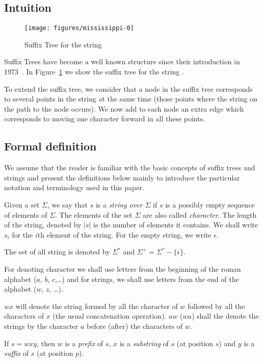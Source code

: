 \subsection{Intuition}

\begin{figure}
\texttt{[image: figures/mississippi-0]}
\caption{Suffix Tree for the string }%
\label{fig:mississippi-0}
\end{figure}

Suffix Trees have become a well known structure since their introduction in 1973~\cite{weiner}. In Figure~\ref{fig:mississippi-0} we show the suffix tree for the string .

To extend the suffix tree, we consider that a node in the suffix tree corresponds to several points in the string at the same time (those points where the string on the path to the node occurs). We now add to each node an extra edge which corresponds to moving one character forward in all these points.

\subsection{Formal definition}

We assume that the reader is familiar with the basic concepts of suffix trees and strings and present the definitions below mainly to introduce the particular notation and terminology used in this paper.

\begin{definition}
Given a set $\Sigma$, we say that $s$ is a \emph{string over $\Sigma$} if $s$ is a possibly empty sequence of elements of $\Sigma$. The elements of the set $\Sigma$ are also called \emph{character}. The length of the string, denoted by $|s|$ is the number of elements it contains. We shall write $s_i$ for the $i$th element of the string. For the empty string, we write $\epsilon$.

The set of all string is denoted by $\Sigma^*$ and $\Sigma^+=\Sigma^*-\{\epsilon\}$.
\end{definition}

For denoting character we shall use letters from the beginning of the roman alphabet ($a$, $b$, $c$,\ldots) and for strings, we shall use letters from the end of the alphabet ($w$, $z$, \ldots).

\begin{definition}
$wx$ will denote the string formed by all the character of $w$ followed by all the characters of $x$ (the usual concatenation operation). $aw$ ($wa$) shall the denote the strings by the character $a$ before (after) the characters of $w$.

If $s = wxy$, then $w$ is a \emph{prefix} of $s$, $x$ is a \emph{substring} of $s$ (at position $s$) and $y$ is a \emph{suffix} of $s$ (at position $p$).
\end{definition}


